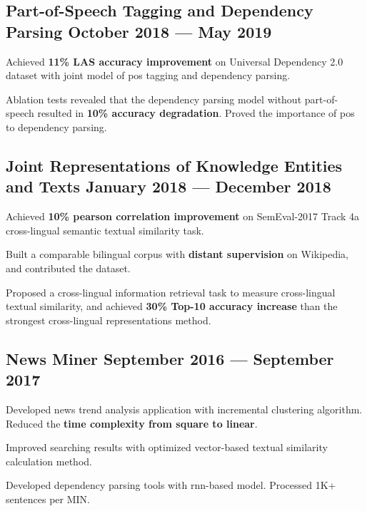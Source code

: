 \subsection*{Part-of-Speech Tagging and Dependency Parsing \hfill October 2018 --- May 2019} 
    \begin{zitemize}
        \item Achieved \textbf{11\% LAS accuracy improvement} on Universal Dependency 2.0 dataset with joint model of pos tagging and dependency parsing.
        \item Ablation tests revealed that the dependency parsing model without part-of-speech resulted in \textbf{10\% accuracy degradation}. Proved the importance of pos to dependency parsing.
    \end{zitemize}


\subsection*{Joint Representations of Knowledge Entities and Texts \hfill January 2018 --- December 2018} 
    \begin{zitemize}
        \item Achieved \textbf{10\% pearson correlation improvement} on SemEval-2017 Track 4a cross-lingual semantic textual similarity task.
        \item Built a comparable bilingual corpus with \textbf{distant supervision} on Wikipedia, and contributed the dataset.
        \item Proposed a cross-lingual information retrieval task to measure cross-lingual textual similarity, and achieved \textbf{30\% Top-10 accuracy increase} than the strongest cross-lingual representations method.
    \end{zitemize}


\subsection*{News Miner \hfill September 2016 --- September 2017} 
    \begin{zitemize}
        \item Developed news trend analysis application with incremental clustering algorithm. Reduced the \textbf{time complexity from square to linear}.
        \item Improved searching results with optimized vector-based textual similarity calculation method.
        \item Developed dependency parsing tools with rnn-based model. Processed 1K+ sentences per MIN.
    \end{zitemize}
